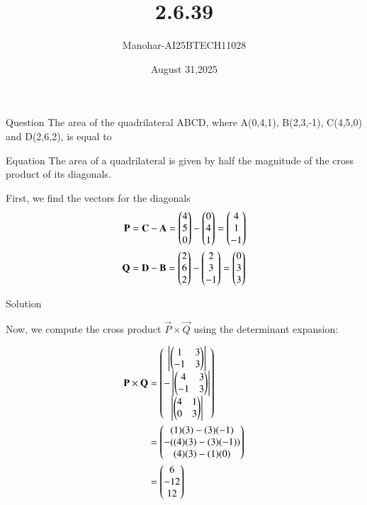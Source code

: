 \documentclass{beamer}
\title {2.6.39}
\date{August 31,2025}
\author 
{Manohar-AI25BTECH11028}
\begin{document}
\frame{\titlepage}
\begin{frame}{Question}
The area of the quadrilateral ABCD, where A(0,4,1), B(2,3,-1), C(4,5,0) and D(2,6,2), is equal to
\end{frame}





\begin{frame}{Equation}
The area of a quadrilateral is given by half the magnitude of the cross product of its diagonals.  

First, we find the vectors for the diagonals  
\begin{align*}
 \mathbf{P} &= \mathbf{C} - \mathbf{A} = \begin{pmatrix}4\\5\\0\end{pmatrix} - \begin{pmatrix}0\\4\\1\end{pmatrix} = \begin{pmatrix}4\\1\\-1\end{pmatrix} \\
 \mathbf{Q} &= \mathbf{D} - \mathbf{B} = \begin{pmatrix}2\\6\\2\end{pmatrix} - \begin{pmatrix}2\\3\\-1\end{pmatrix} = \begin{pmatrix}0\\3\\3\end{pmatrix} 
\end{align*}
\end{frame}
\begin{frame}{Solution}

Now, we compute the cross product $\vec{P} \times \vec{Q}$ using the determinant expansion:  

\begin{align*}
\mathbf{P} \times \mathbf{Q} &= 
\begin{pmatrix}
\left|\begin{pmatrix}1 & 3 \\ -1 & 3\end{pmatrix}\right| \\
-\left|\begin{pmatrix}4 & 3 \\ -1 & 3\end{pmatrix}\right| \\
\left|\begin{pmatrix}4 & 1 \\ 0 & 3\end{pmatrix}\right|
\end{pmatrix} \\
&= \begin{pmatrix}(1)(3) - (3)(-1) \\ -( (4)(3) - (3)(-1)) \\ (4)(3) - (1)(0)\end{pmatrix} \\
&= \begin{pmatrix}6 \\ -12 \\ 12\end{pmatrix}
\end{align*}
\end{frame}
\end{document}
